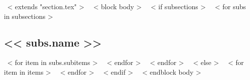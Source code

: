 ~< extends "section.tex" >~
~< block body >~
  ~< if subsections >~
    ~< for subs in subsections >~
      \subsection{<< subs.name >>}
        ~< for item in subs.subitems >~
        ~< endfor >~
    ~< endfor >~
  ~< else >~
    ~< for item in items >~
    ~< endfor >~
  ~< endif >~
~< endblock body >~
